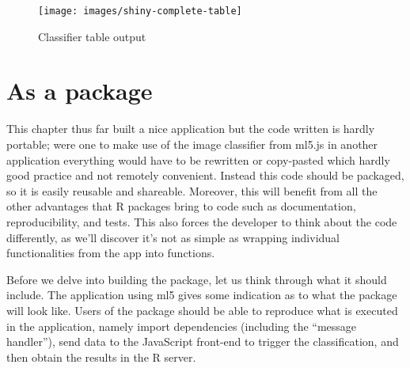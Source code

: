 \documentclass[10pt,]{krantz}
\makeatletter
\newenvironment{Shaded}{\begin{snugshade}}{\end{snugshade}}
\newcommand{\KeywordTok}[1]{\textcolor[rgb]{0.27,0.27,0.27}{\textbf{#1}}}
\newcommand{\NormalTok}[1]{#1}
\newcommand{\OperatorTok}[1]{\textcolor[rgb]{0.43,0.43,0.43}{\textbf{#1}}}
\newcommand{\StringTok}[1]{\textcolor[rgb]{0.5,0.5,0.5}{#1}}
\newenvironment{kframe}{%
\medskip{}
\setlength{\fboxsep}{.8em}
 \def\at@end@of@kframe{}%
 \ifinner\ifhmode%
  \def\at@end@of@kframe{\end{minipage}}%
  \begin{minipage}{\columnwidth}%
 \fi\fi%
 \def\FrameCommand##1{\hskip\@totalleftmargin \hskip-\fboxsep
 \colorbox{shadecolor}{##1}\hskip-\fboxsep
     \hskip-\linewidth \hskip-\@totalleftmargin \hskip\columnwidth}%
 \MakeFramed {\advance\hsize-\width
   \@totalleftmargin\z@ \linewidth\hsize
   \@setminipage}}%
 {\par\unskip\endMakeFramed%
 \at@end@of@kframe}
\renewenvironment{Shaded}{\begin{kframe}}{\end{kframe}}
\makeatother
\begin{document}
\begin{Shaded}
\begin{Highlighting}[]
{  \KeywordTok{observeEvent}\NormalTok{(input}\OperatorTok{$}\NormalTok{classify, \{}
\NormalTok{    session}\OperatorTok{$}\KeywordTok{sendCustomMessage}\NormalTok{(}\StringTok{"classify"}\NormalTok{, }\KeywordTok{list}\NormalTok{())}
\NormalTok{  \})}

\NormalTok{  output}\OperatorTok{$}\NormalTok{results <-}\StringTok{ }\KeywordTok{renderTable}\NormalTok{(\{}
\NormalTok{    input}\OperatorTok{$}\NormalTok{classification}
\NormalTok{  \})}

\NormalTok{\}}

\KeywordTok{shinyApp}\NormalTok{(ui, server)}
\end{Highlighting}
\end{Shaded}

\begin{figure}[H]

{\centering \texttt{[image: images/shiny-complete-table]} 

}

\caption{Classifier table output}\label{fig:shiny-complete-table-output}
\end{figure}

\hypertarget{shiny-complete-pkg}{%
\section{As a package}\label{shiny-complete-pkg}}

This chapter thus far built a nice application but the code written is hardly portable; were one to make use of the image classifier from ml5.js in another application everything would have to be rewritten or copy-pasted which hardly good practice and not remotely convenient. Instead this code should be packaged, so it is easily reusable and shareable. Moreover, this will benefit from all the other advantages that R packages bring to code such as documentation, reproducibility, and tests. This also forces the developer to think about the code differently, as we'll discover it's not as simple as wrapping individual functionalities from the app into functions.

Before we delve into building the package, let us think through what it should include. The application using ml5 gives some indication as to what the package will look like. Users of the package should be able to reproduce what is executed in the application, namely import dependencies (including the ``message handler''), send data to the JavaScript front-end to trigger the classification, and then obtain the results in the R server.
\end{document}
